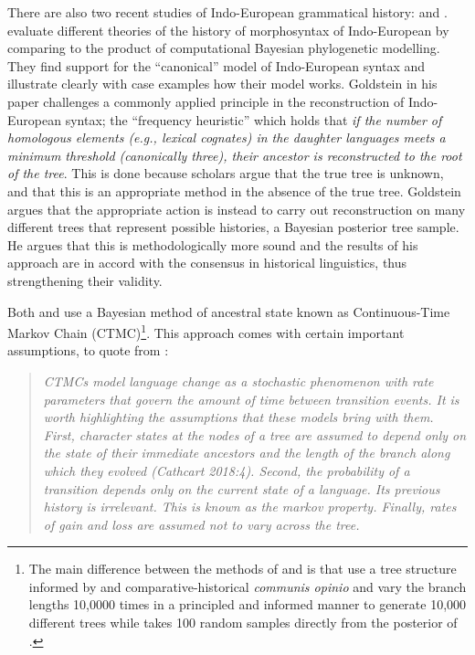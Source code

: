\documentclass[a4paper,10pt]{article} %
\begin{document}
There are also two recent studies of Indo-European grammatical history: \citet{carling2021reconstructing} and \citet{goldstein_2022}. \citet{carling2021reconstructing} evaluate different theories of the history of morphosyntax of Indo-European by comparing to the product of computational Bayesian phylogenetic modelling. They find support for the ``canonical'' model of Indo-European syntax and illustrate clearly with case examples how their model works. Goldstein in his paper challenges a commonly applied principle in the reconstruction of Indo-European syntax; the ``frequency heuristic'' which holds that \emph{if the number of homologous elements (e.g., lexical cognates) in the daughter languages meets a minimum threshold (canonically three), their ancestor is reconstructed to the root of the tree}\citep[1/71]{goldstein_2022}. This is done because scholars argue that the true tree is unknown, and that this is an appropriate method in the absence of the true tree. Goldstein argues that the appropriate action is instead to carry out reconstruction on many different trees that represent possible histories, a Bayesian posterior tree sample. He argues that this is methodologically more sound and the results of his approach are in accord with the consensus in historical linguistics, thus strengthening their validity.

Both \citet{carling2021reconstructing} and \citet{goldstein_2022} use a Bayesian method of ancestral state known as Continuous-Time Markov Chain (CTMC)\footnote{The main difference between the methods of \citet{carling2021reconstructing} and \citet{chang2015ancestry} is that \citet{carling2021reconstructing} use a tree structure informed by \citet{chang2015ancestry} and comparative-historical \emph{communis opinio} and vary the branch lengths 10,0000 times in a principled and informed manner to generate 10,000 different trees while \citet{goldstein_2022} takes 100 random samples directly from the posterior of \citet{chang2015ancestry}.}. This approach comes with certain important assumptions, to quote from \citet[77]{goldstein_2022}:

\begin{quotation} \emph{
CTMCs model language change as a stochastic phenomenon with rate parameters that govern the amount of time between transition events. It is worth highlighting the assumptions that these models bring with them. First, character states at the nodes of a tree are assumed to depend only on the state of their immediate ancestors and the length of the branch along which they evolved (Cathcart 2018:4). Second, the probability of a transition depends only on the current state of a language. Its previous history is irrelevant. This is known as the markov property. Finally, rates of gain and loss are assumed not to vary across the tree.}
\end{quotation}
\end{document}
